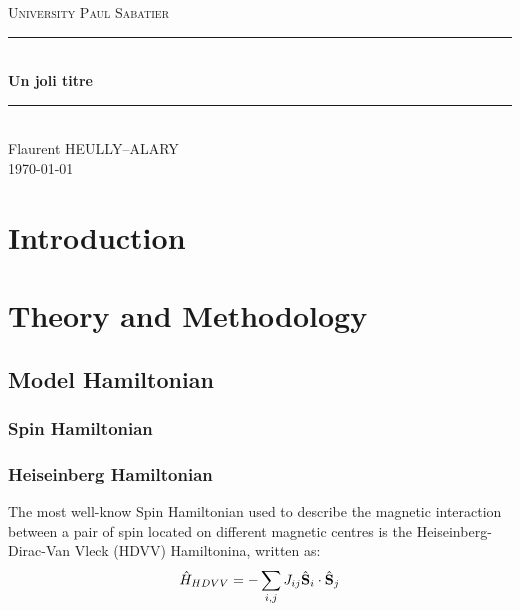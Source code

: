 \documentclass[10pt]{report}
\numberwithin{equation}{section}
\newcommand{\noun}[1]{\textsc{#1}}
\begin{document}

\begin{titlepage}
\newcommand{\HRule}{\rule{\linewidth}{0.5mm}}
\center
\textsc{\LARGE
University \noun{Paul Sabatier}
} \\[1cm]
\HRule\\[0.4cm]
{ \huge \bfseries Un joli titre \\[0.15cm] }
\HRule\\[1.5cm]
Flaurent HEULLY--ALARY
\\[1cm]
\today \\ [1cm]
\end{titlepage}
\begin{center}
\thispagestyle{plain}
\par\end{center}
\large
\tableofcontents
\newpage
\chapter{Introduction}

\chapter{Theory and Methodology}

\section{Model Hamiltonian}

\subsection{Spin Hamiltonian}

\subsection*{Heiseinberg Hamiltonian}
The most well-know Spin Hamiltonian used to describe the magnetic interaction between a pair of spin located on different magnetic centres is the Heiseinberg-Dirac-Van Vleck (HDVV) Hamiltonina, written as:
\begin{equation}\label{Hheis}
    \hat{H}_{HDVV}=-\sum_{i,j} J_{ij} \hat{\vb S}_i \cdot \hat{\vb S}_j
\end{equation}
\end{document}
